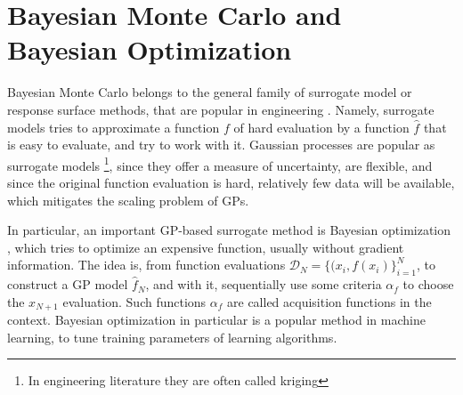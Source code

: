 \section{Bayesian Monte Carlo and Bayesian Optimization}
Bayesian Monte Carlo belongs to the general family of surrogate model or response surface methods, that are popular in engineering \cite{Booker_1999,Jones_2001,Asher_2015}. Namely, surrogate models tries to approximate a function $f$ of hard evaluation by a function $\hat{f}$ that is easy to evaluate, and try to work with it. Gaussian processes are popular as surrogate models \footnote{In engineering literature they are often called kriging}, since they offer a measure of uncertainty, are flexible, and since the original function evaluation is hard, relatively few data will be available, which mitigates the scaling problem of GPs.

In particular, an important GP-based surrogate method is Bayesian optimization \cite{Shahriari_2016,Brochu_2010,Snoek_2012}, which tries to optimize an expensive function, usually without gradient information. The idea is, from function evaluations $\mathcal{D}_N = \{(x_i,f(x_i)\}_{i=1}^N$, to construct a GP model $\hat{f}_N$, and with it, sequentially use some criteria $\alpha_f$ to choose the $x_{N+1}$ evaluation. Such functions $\alpha_f$ are called acquisition functions in the context. Bayesian optimization in particular is a popular method in machine learning, to tune training parameters of learning algorithms.


